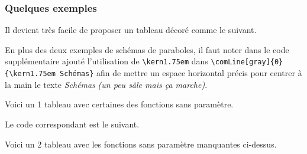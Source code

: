 \documentclass[12pt,a4paper]{article}
\begin{document}
%

\subsubsection{Quelques exemples}  \label{tnsana-graphsign-examples}


Il devient très facile de proposer un tableau décoré comme le suivant.

\begin{center}
	
\end{center}


En plus des deux exemples de schémas de paraboles, il faut noter dans le code supplémentaire ajouté l'utilisation de \verb#\kern1.75em# dans \verb#\comLine[gray]{0}{\kern1.75em Schémas}# afin de mettre un espace horizontal précis pour centrer à la main le texte \emph{\og Schémas \fg} \emph{(un peu sâle mais ça marche)}.

\medskip






Voici un 1\ier{} tableau avec certaines des fonctions sans paramètre.

\begin{center}
	
\end{center}

Le code correspondant est le suivant.

\medskip


\medskip

Voici un 2\ieme{} tableau avec les fonctions sans paramètre manquantes ci-dessus.

\begin{center}
	
\end{center}
\end{document}
